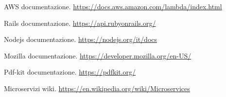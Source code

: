 \documentclass[12pt]{article}
\begin{document}
\begin{thebibliography}{9}
  AWS documentazione. 
  \url{https://docs.aws.amazon.com/lambda/index.html}

  Rails documentazione.
  \url{https://api.rubyonrails.org/}

  Nodejs documentazione.
  \url{https://nodejs.org/it/docs}

  Mozilla documentazione.
  \url{https://developer.mozilla.org/en-US/}

  Pdf-kit documentazione.
  \url{https://pdfkit.org/}

  Microservizi wiki.
  \url{https://en.wikipedia.org/wiki/Microservices}
\end{thebibliography}
\end{document}
